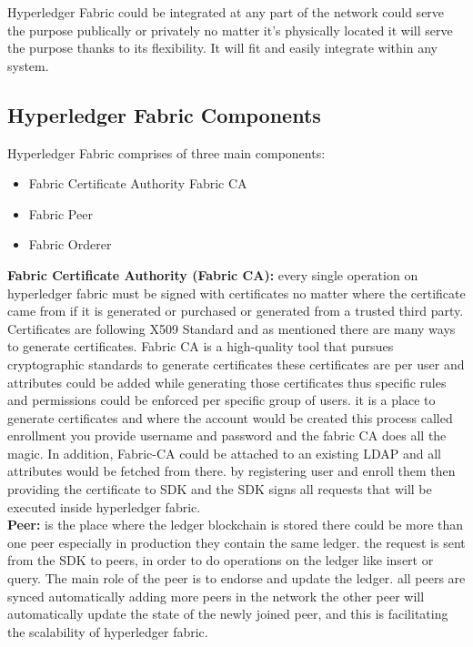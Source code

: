 Hyperledger Fabric could be integrated at any part of the network could serve the purpose publically or privately no matter it's physically located it will serve the purpose thanks to its flexibility. It will fit and easily integrate within any system. \\ 


\subsection{Hyperledger Fabric Components} 

Hyperledger Fabric comprises of three main components:
\begin{itemize}
  \item Fabric Certificate Authority Fabric CA 
  \item Fabric Peer 
  \item Fabric Orderer 
\end{itemize} 
\bigskip
\textbf{ Fabric Certificate Authority (Fabric CA):} every single operation on hyperledger fabric must be signed with certificates no matter where the certificate came from if it is generated or purchased or generated from a trusted third party. Certificates are following X509 Standard and as mentioned there are many ways to generate certificates.
Fabric CA is a high-quality tool that pursues cryptographic standards to generate certificates these certificates are per user and attributes could be added while generating those certificates thus specific rules and permissions could be enforced per specific group of users. it is a place to generate certificates and where the account would be created this process called enrollment you provide username and password and the fabric CA does all the magic. 
In addition, Fabric-CA could be attached to an existing LDAP and all attributes would be fetched from there. 
by registering user and enroll them then providing the certificate to SDK and the SDK signs all requests that will be executed inside hyperledger fabric. \\ 

\textbf{Peer:} is the place where the ledger blockchain is stored there could be more than one peer especially in production they contain the same ledger.  the request is sent from the SDK to peers, in order to do operations on the ledger like insert or query.  The main role of the peer is to endorse and update the ledger. all peers are synced automatically adding more peers in the network the other peer will automatically update the state of the newly joined peer, and this is facilitating the scalability of hyperledger fabric.  \\ 

